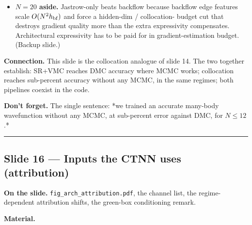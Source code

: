 \documentclass[11pt]{article}
\begin{document}
\begin{itemize}
\begin{itemize}
and $+0.24\%$.
\item The boundary is \emph{physical}: it coincides with the Wigner crossover
where the state's sensitivity to single-parameter perturbations
decouples into orthogonal modes that the Fisher estimate can't
resolve from 4096 samples.
\end{itemize}
\item \textbf{$N{=}20$ aside.} Jastrow-only beats backflow because backflow edge
features scale $O(N^2 h_{\rm bf})$ and force a hidden-dim / collocation-
budget cut that destroys gradient quality more than the extra
expressivity compensates. Architectural expressivity has to be paid for
in gradient-estimation budget. (Backup slide.)
\end{itemize}
\textbf{Connection.} This slide is the collocation analogue of slide 14. The
two together establish: SR+VMC reaches DMC accuracy where MCMC works;
collocation reaches sub-percent accuracy without any MCMC, in the same
regimes; both pipelines coexist in the code.

\textbf{Don't forget.} The single sentence: *we trained an accurate many-body
wavefunction without any MCMC, at sub-percent error against DMC, for
$N \le 12$.*

\vspace{4pt}\hrule\vspace{8pt}

\subsection*{Slide 16 --- Inputs the CTNN uses (attribution)}

\textbf{On the slide.} \texttt{fig\_arch\_attribution.pdf}, the channel list, the
regime-dependent attribution shifts, the green-box conditioning remark.

\textbf{Material.}
\end{document}
